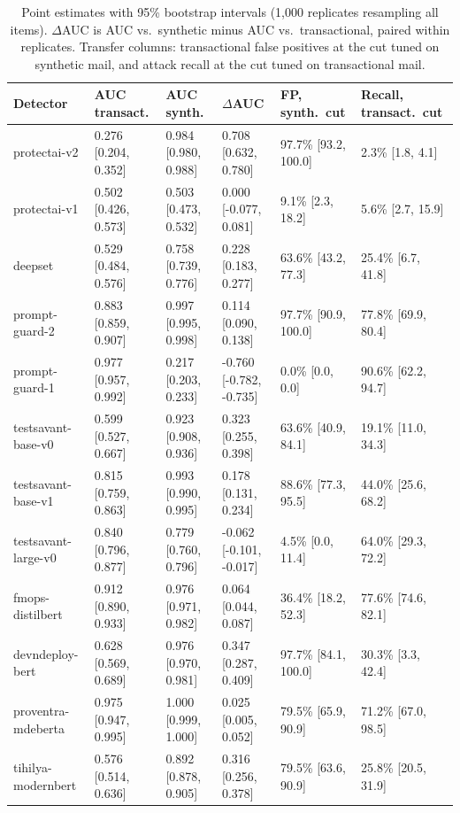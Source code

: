 \documentclass[11pt]{article}
\begin{document}
\begin{table}[h]
\centering
\scriptsize
\setlength{\tabcolsep}{2pt}
\caption{Point estimates with 95\% bootstrap intervals (1{,}000 replicates resampling all items). $\Delta$AUC is AUC vs.\ synthetic minus AUC vs.\ transactional, paired within replicates. Transfer columns: transactional false positives at the cut tuned on synthetic mail, and attack recall at the cut tuned on transactional mail.}
\label{tab:boot}
\begin{tabular}{llllll}
\toprule
Detector & AUC transact. & AUC synth. & $\Delta$AUC & FP, synth.\ cut & Recall, transact.\ cut \\
\midrule
protectai-v2 & 0.276 [0.204, 0.352] & 0.984 [0.980, 0.988] & 0.708 [0.632, 0.780] & 97.7\% [93.2, 100.0] & 2.3\% [1.8, 4.1] \\
protectai-v1 & 0.502 [0.426, 0.573] & 0.503 [0.473, 0.532] & 0.000 [-0.077, 0.081] & 9.1\% [2.3, 18.2] & 5.6\% [2.7, 15.9] \\
deepset & 0.529 [0.484, 0.576] & 0.758 [0.739, 0.776] & 0.228 [0.183, 0.277] & 63.6\% [43.2, 77.3] & 25.4\% [6.7, 41.8] \\
prompt-guard-2 & 0.883 [0.859, 0.907] & 0.997 [0.995, 0.998] & 0.114 [0.090, 0.138] & 97.7\% [90.9, 100.0] & 77.8\% [69.9, 80.4] \\
prompt-guard-1 & 0.977 [0.957, 0.992] & 0.217 [0.203, 0.233] & -0.760 [-0.782, -0.735] & 0.0\% [0.0, 0.0] & 90.6\% [62.2, 94.7] \\
testsavant-base-v0 & 0.599 [0.527, 0.667] & 0.923 [0.908, 0.936] & 0.323 [0.255, 0.398] & 63.6\% [40.9, 84.1] & 19.1\% [11.0, 34.3] \\
testsavant-base-v1 & 0.815 [0.759, 0.863] & 0.993 [0.990, 0.995] & 0.178 [0.131, 0.234] & 88.6\% [77.3, 95.5] & 44.0\% [25.6, 68.2] \\
testsavant-large-v0 & 0.840 [0.796, 0.877] & 0.779 [0.760, 0.796] & -0.062 [-0.101, -0.017] & 4.5\% [0.0, 11.4] & 64.0\% [29.3, 72.2] \\
fmops-distilbert & 0.912 [0.890, 0.933] & 0.976 [0.971, 0.982] & 0.064 [0.044, 0.087] & 36.4\% [18.2, 52.3] & 77.6\% [74.6, 82.1] \\
devndeploy-bert & 0.628 [0.569, 0.689] & 0.976 [0.970, 0.981] & 0.347 [0.287, 0.409] & 97.7\% [84.1, 100.0] & 30.3\% [3.3, 42.4] \\
proventra-mdeberta & 0.975 [0.947, 0.995] & 1.000 [0.999, 1.000] & 0.025 [0.005, 0.052] & 79.5\% [65.9, 90.9] & 71.2\% [67.0, 98.5] \\
tihilya-modernbert & 0.576 [0.514, 0.636] & 0.892 [0.878, 0.905] & 0.316 [0.256, 0.378] & 79.5\% [63.6, 90.9] & 25.8\% [20.5, 31.9] \\
\bottomrule
\end{tabular}
\end{table}
\end{document}

